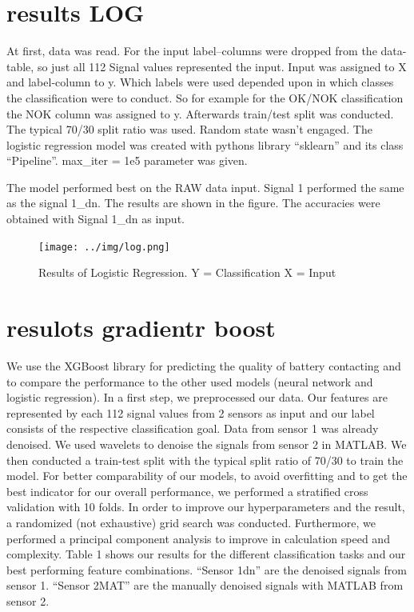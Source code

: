 \documentclass[12pt]{report}
\begin{document}
\section{results LOG}
At first, data was read. For the input label–columns were dropped from the data-table, so just all 112 Signal values represented the input. Input was assigned to X and label-column to y. Which labels were used depended upon in which classes the classification were to conduct. So for example for the OK/NOK classification the NOK column was assigned to y. 
\newline
Afterwards train/test split was conducted. The typical 70/30 split ratio was used. Random state wasn’t engaged. The logistic regression model was created with pythons library “sklearn” and its class “Pipeline”. max\_iter = 1e5 parameter was given.\newline



The model performed best on the RAW data input. Signal 1 performed the same as the signal 1\_dn. The results are shown in the figure. The accuracies were obtained with Signal 1\_dn as input.
\begin{figure}[H]
	\centering
	\texttt{[image: ../img/log.png]}
	\caption{Results of Logistic Regression. Y = Classification 
		X = Input 
	}
	\label{fig:log}
\end{figure}





\section{resulots gradientr boost }
We use the XGBoost library for predicting the quality of battery contacting and to compare the performance to the other used models (neural network and logistic regression). In a first step, we preprocessed our data. Our features are represented by each 112 signal values from 2 sensors as input and our label consists of the respective classification goal. Data from sensor 1 was already denoised. We used wavelets to denoise the signals from sensor 2 in MATLAB. We then conducted a train-test split with the typical split ratio of 70/30 to train the model. For better comparability of our models, to avoid overfitting and to get the best indicator for our overall performance, we performed a stratified cross validation with 10 folds. In order to improve our hyperparameters and the result, a randomized (not exhaustive) grid search was conducted. Furthermore, we performed a principal component analysis to improve in calculation speed and complexity. Table 1 shows our results for the different classification tasks and our best performing feature combinations. “Sensor 1dn” are the denoised signals from sensor 1. “Sensor 2MAT” are the manually denoised signals with MATLAB from sensor 2.
\end{document}
